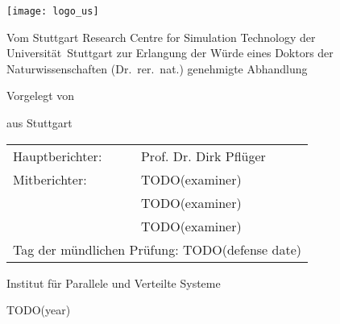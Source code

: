 \begin{titlepage}
  \begin{center}
    \setlength{\parindent}{0pt}
    
    \texttt{[image: logo\_us]}
    
    \vfill
    
    {\textbf{\LARGE\thetitle}\par}
    
    \vfill
    
    Vom Stuttgart Research Centre for Simulation Technology der
    Universität~Stuttgart zur Erlangung der Würde eines Doktors der
    Naturwissenschaften (Dr.~rer.~nat.) genehmigte Abhandlung
    
    \vfill
    
    Vorgelegt von
    
    \vspace{1mm}
    
    \textbf{\large\theauthor}
    
    aus Stuttgart
    
    \vfill
    
    \begin{tabular}{ll}
      Hauptberichter:&
      Prof. Dr. Dirk Pflüger\\
      Mitberichter:&
      TODO(examiner)\\
      &TODO(examiner)\\
      &TODO(examiner)\\[5mm]
      \multicolumn{2}{l}{%
        Tag der mündlichen Prüfung:\quad
        TODO(defense date)%
      }
    \end{tabular}
    
    \vfill
    
    Institut für Parallele und Verteilte Systeme
    
    \vspace{5mm}
    
    TODO(year)
  \end{center}
\end{titlepage}

